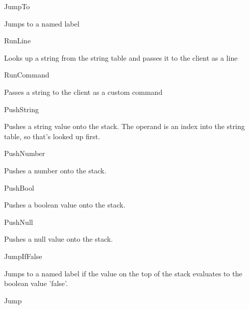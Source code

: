 \begin{DoxyItemize}
\item Jump\-To
\end{DoxyItemize}

Jumps to a named label


\begin{DoxyItemize}
\item Run\-Line
\end{DoxyItemize}

Looks up a string from the string table and passes it to the client as a line


\begin{DoxyItemize}
\item Run\-Command
\end{DoxyItemize}

Passes a string to the client as a custom command


\begin{DoxyItemize}
\item Push\-String
\end{DoxyItemize}

Pushes a string value onto the stack. The operand is an index into the string table, so that's looked up first.


\begin{DoxyItemize}
\item Push\-Number
\end{DoxyItemize}

Pushes a number onto the stack.


\begin{DoxyItemize}
\item Push\-Bool
\end{DoxyItemize}

Pushes a boolean value onto the stack.


\begin{DoxyItemize}
\item Push\-Null
\end{DoxyItemize}

Pushes a null value onto the stack.


\begin{DoxyItemize}
\item Jump\-If\-False
\end{DoxyItemize}

Jumps to a named label if the value on the top of the stack evaluates to the boolean value 'false'.


\begin{DoxyItemize}
\item Jump
\end{DoxyItemize}

